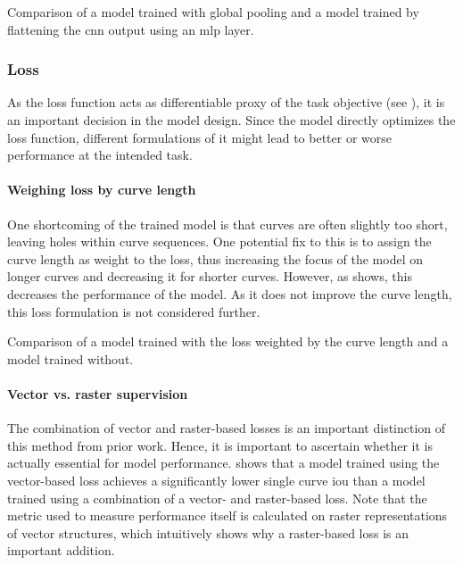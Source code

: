 
\begin{table}[]
    \centering

    \caption{Comparison of a model trained with global pooling and a model trained by flattening the \gls{cnn} output using an \gls{mlp} layer.}
    \label{tab:versions-globalpool}
\end{table}

\subsubsection{Loss}

As the loss function acts as differentiable proxy of the task objective (see ), it is an important decision in the model design. Since the model directly optimizes the loss function, different formulations of it might lead to better or worse performance at the intended task.

\paragraph{Weighing loss by curve length}
One shortcoming of the trained model is that curves are often slightly too short, leaving holes within curve sequences. One potential fix to this is to assign the curve length as weight to the loss, thus increasing the focus of the model on longer curves and decreasing it for shorter curves. However, as  shows, this decreases the performance of the model. As it does not improve the curve length, this loss formulation is not considered further.

\begin{table}[]
    \centering

    \caption{Comparison of a model trained with the loss weighted by the curve length and a model trained without.}
    \label{tab:versions-curve-length-loss-weight}
\end{table}

\paragraph{Vector vs. raster supervision}

The combination of vector and raster-based losses is an important distinction of this method from prior work. Hence, it is important to ascertain whether it is actually essential for model performance.  shows that a model trained using the vector-based loss achieves a significantly lower single curve \gls{iou} than a model trained using a combination of a vector- and raster-based loss. Note that the metric used to measure performance itself is calculated on raster representations of vector structures, which intuitively shows why a raster-based loss is an important addition.

